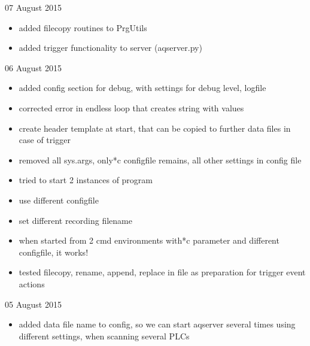 \documentclass[a4paper,10pt,english]{sphinxmanual}
\begin{document}
07 August 2015
\begin{itemize}
\item {} 
added filecopy routines to PrgUtils

\item {} 
added trigger functionality to server (aqserver.py)

\end{itemize}

06 August 2015
\begin{itemize}
\item {} 
added config section for debug, with settings for debug level, logfile

\item {} 
corrected error in endless loop that creates string with values

\item {} 
create header template at start, that can be copied to further data files in case of trigger

\item {} 
removed all sys.args, only*c configfile remains, all other settings in config file

\item {} 
tried to start 2 instances of program

\end{itemize}
\begin{itemize}
\item {} 
use different configfile

\item {} 
set different recording filename

\item {} 
when started from 2 cmd environments with*c parameter and different configfile, it works!

\end{itemize}
\begin{itemize}
\item {} 
tested filecopy, rename, append, replace in file as preparation for trigger event actions

\end{itemize}

05 August 2015
\begin{itemize}
\item {} 
added data file name to config, so we can start aqserver several times using different settings, when scanning several PLCs

\end{itemize}
\end{document}

